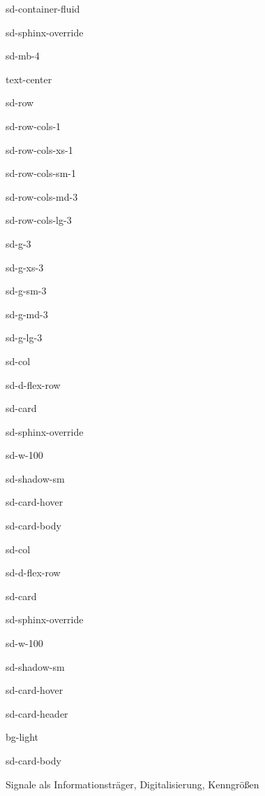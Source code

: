 \documentclass[letterpaper,10pt,english]{jupyterBook}
\let\sphinxpxdimen\pdfpxdimen\else\newdimen\sphinxpxdimen
\begin{document}
\begin{sphinxuseclass}{sd-container-fluid}
\begin{sphinxuseclass}{sd-sphinx-override}
\begin{sphinxuseclass}{sd-mb-4}
\begin{sphinxuseclass}{text-center}
\begin{sphinxuseclass}{sd-row}
\begin{sphinxuseclass}{sd-row-cols-1}
\begin{sphinxuseclass}{sd-row-cols-xs-1}
\begin{sphinxuseclass}{sd-row-cols-sm-1}
\begin{sphinxuseclass}{sd-row-cols-md-3}
\begin{sphinxuseclass}{sd-row-cols-lg-3}
\begin{sphinxuseclass}{sd-g-3}
\begin{sphinxuseclass}{sd-g-xs-3}
\begin{sphinxuseclass}{sd-g-sm-3}
\begin{sphinxuseclass}{sd-g-md-3}
\begin{sphinxuseclass}{sd-g-lg-3}
\begin{sphinxuseclass}{sd-col}
\begin{sphinxuseclass}{sd-d-flex-row}
\begin{sphinxuseclass}{sd-card}
\begin{sphinxuseclass}{sd-sphinx-override}
\begin{sphinxuseclass}{sd-w-100}
\begin{sphinxuseclass}{sd-shadow-sm}
\begin{sphinxuseclass}{sd-card-hover}
\begin{sphinxuseclass}{sd-card-body}
\end{sphinxuseclass}{\hyperref[\detokenize{content/2_Stationaer::doc}]{}}
\end{sphinxuseclass}
\end{sphinxuseclass}
\end{sphinxuseclass}
\end{sphinxuseclass}
\end{sphinxuseclass}
\end{sphinxuseclass}
\end{sphinxuseclass}
\begin{sphinxuseclass}{sd-col}
\begin{sphinxuseclass}{sd-d-flex-row}
\begin{sphinxuseclass}{sd-card}
\begin{sphinxuseclass}{sd-sphinx-override}
\begin{sphinxuseclass}{sd-w-100}
\begin{sphinxuseclass}{sd-shadow-sm}
\begin{sphinxuseclass}{sd-card-hover}
\begin{sphinxuseclass}{sd-card-header}
\begin{sphinxuseclass}{bg-light}
\sphinxAtStartPar
{}

\end{sphinxuseclass}
\end{sphinxuseclass}
\begin{sphinxuseclass}{sd-card-body}
\noindent\sphinxincludegraphics[height=120\sphinxpxdimen]{{digitalisierung1}.png}

\sphinxAtStartPar
Signale als Informationsträger, Digitalisierung, Kenngrößen


\end{sphinxuseclass}
\end{sphinxuseclass}
\end{sphinxuseclass}
\end{sphinxuseclass}
\end{sphinxuseclass}
\end{sphinxuseclass}
\end{sphinxuseclass}
\end{sphinxuseclass}
\end{sphinxuseclass}
\end{sphinxuseclass}
\end{sphinxuseclass}
\end{sphinxuseclass}
\end{sphinxuseclass}
\end{sphinxuseclass}
\end{sphinxuseclass}
\end{sphinxuseclass}
\end{sphinxuseclass}
\end{sphinxuseclass}
\end{sphinxuseclass}
\end{sphinxuseclass}
\end{sphinxuseclass}
\end{sphinxuseclass}
\end{sphinxuseclass}
\end{document}
